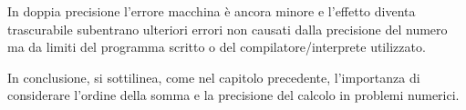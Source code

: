 In doppia precisione l'errore macchina è ancora minore e l'effetto diventa trascurabile
subentrano ulteriori errori non causati dalla precisione del numero ma da limiti 
del programma scritto o del compilatore/interprete utilizzato.

In conclusione, si sottilinea, come nel capitolo precedente, l'importanza di considerare
l'ordine della somma e la precisione del calcolo in problemi numerici.









